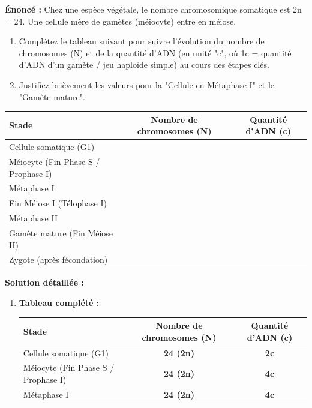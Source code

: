\documentclass[11pt]{article}
\begin{document}
\begin{exoresolu}
    \textbf{Énoncé :} Chez une espèce végétale, le nombre chromosomique somatique est 2n = 24. Une cellule mère de gamètes (méiocyte) entre en méiose.
    \begin{enumerate}
        \item Complétez le tableau suivant pour suivre l'évolution du nombre de chromosomes (N) et de la quantité d'ADN (en unité "c", où 1c = quantité d'ADN d'un gamète / jeu haploïde simple) au cours des étapes clés.
        \item Justifiez brièvement les valeurs pour la "Cellule en Métaphase I" et le "Gamète mature".
    \end{enumerate}
    \begin{center}
        \begin{tabular}{|l|cc|}\hline
            \rowcolor{popblueL} \textbf{Stade} & \textbf{Nombre de chromosomes (N)} & \textbf{Quantité d'ADN (c)} \\ \hline
            Cellule somatique (G1) & & \\ \hline
            Méiocyte (Fin Phase S / Prophase I) & & \\ \hline
            Métaphase I & & \\ \hline
            Fin Méiose I (Télophase I) & & \\ \hline
            Métaphase II & & \\ \hline
            Gamète mature (Fin Méiose II) & & \\ \hline
            Zygote (après fécondation) & & \\ \hline
        \end{tabular}
    \end{center}
    \tcblower
    \textbf{Solution détaillée :}
    \begin{enumerate}
        \item \textbf{Tableau complété :}
        \begin{center}
            \begin{tabular}{|l|cc|}\hline
                \rowcolor{popblueL} \textbf{Stade} & \textbf{Nombre de chromosomes (N)} & \textbf{Quantité d'ADN (c)} \\ \hline
                Cellule somatique (G1) & \textbf{24 (2n)} & \textbf{2c} \\ \hline
                Méiocyte (Fin Phase S / Prophase I) & \textbf{24 (2n)} & \textbf{4c} \\ \hline
                Métaphase I & \textbf{24 (2n)} & \textbf{4c} \\ \hline

\end{tabular}
\end{center}
\end{enumerate}
\end{exoresolu}
\end{document}

